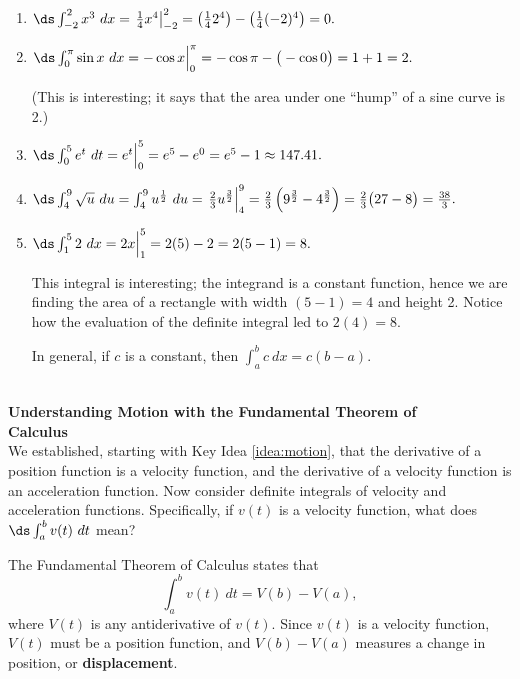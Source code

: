 {\begin{enumerate}
\item	$\ds \int_{-2}^2 x^3\ dx = \left.\frac14x^4\right|_{-2}^2 = \left(\frac142^4\right) - \left(\frac14(-2)^4\right) = 0.$
\item		$\ds \int_0^\pi \sin x\ dx = -\cos x\Big|_0^\pi = -\cos \pi- \big(-\cos 0\big) = 1+1=2.$ 

(This is interesting; it says that the area under one ``hump'' of a sine curve is 2.)
\item	 $\ds \int_0^5e^t\ dt = e^t\Big|_0^5 = e^5 - e^0 = e^5-1 \approx 147.41.$
\item		$\ds \int_4^9 \sqrt{u}\ du = \int_4^9 u^\frac12\ du = \left.\frac23u^\frac32\right|_4^9 = \frac23\left(9^\frac32-4^\frac32\right) = \frac23\big(27-8\big) =\frac{38}3.$
\item		$\ds \int_1^5 2\ dx = 2x\Big|_1^5 = 2(5)-2=2(5-1)=8.$ 

This integral is interesting; the integrand is a constant function, hence we are finding the area of a rectangle with width $(5-1)=4$ and height 2. Notice how the evaluation of the definite integral led to $2(4)=8$. 

In general, if $c$ is a constant, then $\int_a^b c\ dx = c(b-a)$.
\end{enumerate}
\vskip -15pt
}\\

\noindent\textbf{\large Understanding Motion with the Fundamental Theorem of\\
 Calculus}\\

We established, starting with Key Idea \ref{idea:motion}, that the derivative of a position function is a velocity function, and the derivative of a velocity function is an acceleration function. Now consider definite integrals of velocity and acceleration functions. Specifically, if $v(t)$ is a velocity function, what does $\ds \int_a^b v(t)\ dt$ mean?

The Fundamental Theorem of Calculus states that
$$\int_a^b v(t)\ dt = V(b) - V(a),$$ where $V(t)$ is any antiderivative of $v(t)$. Since $v(t)$ is a velocity function, $V(t)$ must be a position function, and $V(b) - V(a)$ measures a change in position, or \textbf{displacement}.\\

